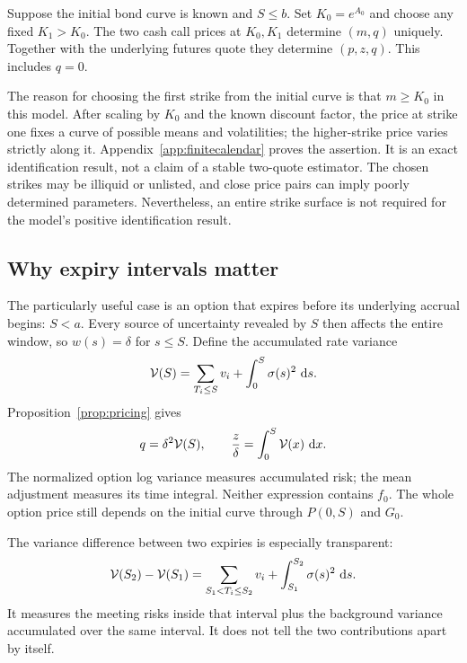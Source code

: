 \begin{proposition}\label{prop:finitequotes}
Suppose the initial bond curve is known and $S\leq b$. Set $K_0=e^{A_0}$ and choose any fixed $K_1>K_0$. The two cash call prices at $K_0,K_1$ determine $(m,q)$ uniquely. Together with the underlying futures quote they determine $(p,z,q)$. This includes $q=0$.
\end{proposition}
The reason for choosing the first strike from the initial curve is that $m\geq K_0$ in this model. After scaling by $K_0$ and the known discount factor, the price at strike one fixes a curve of possible means and volatilities; the higher-strike price varies strictly along it. Appendix~\ref{app:finitecalendar} proves the assertion. It is an exact identification result, not a claim of a stable two-quote estimator. The chosen strikes may be illiquid or unlisted, and close price pairs can imply poorly determined parameters. Nevertheless, an entire strike surface is not required for the model's positive identification result.

\subsection{Why expiry intervals matter}
The particularly useful case is an option that expires before its underlying accrual begins: $S<a$. Every source of uncertainty revealed by $S$ then affects the entire window, so $w(s)=\delta$ for $s\leq S$. Define the accumulated rate variance
\begin{equation}\label{eq:Q}
\mathcal V(S)=\sum_{T_i\leq S}v_i+\int_0^S\sigma(s)^2\,\,\mathrm d s.
\end{equation}
Proposition~\ref{prop:pricing} gives
\begin{equation}\label{eq:Qz}
q=\delta^2 \mathcal V(S),\qquad
\frac{z}{\delta}=\int_0^S \mathcal V(x)\,\,\mathrm d x.
\end{equation}
The normalized option log variance measures accumulated risk; the mean adjustment measures its time integral. Neither expression contains $f_0$. The whole option price still depends on the initial curve through $P(0,S)$ and $G_0$.

The variance difference between two expiries is especially transparent:
\begin{equation}\label{eq:increment}
\mathcal V(S_2)-\mathcal V(S_1)=\sum_{S_1<T_i\leq S_2}v_i
                         +\int_{S_1}^{S_2}\sigma(s)^2\,\,\mathrm d s.
\end{equation}
It measures the meeting risks inside that interval plus the background variance accumulated over the same interval. It does not tell the two contributions apart by itself.
